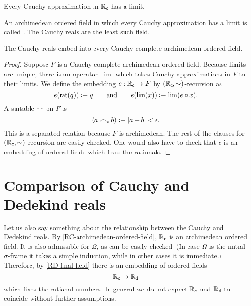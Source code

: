 \begin{thm}
  Every Cauchy approximation in $\mathbb{R}_\mathsf{c}$ has a limit.
\end{thm}

An archimedean ordered field in which every Cauchy approximation has a limit is called
.
%
%
%
The Cauchy reals are the least such field.

\begin{thm} \label{RC-initial-Cauchy-complete}
  The Cauchy reals embed into every Cauchy complete archimedean ordered field.
\end{thm}

\begin{proof}
  Suppose $F$ is a Cauchy complete archimedean ordered field. Because limits are unique,
  there is an operator $\lim$ which takes Cauchy approximations in $F$ to their limits. We
  define the embedding $e : \mathbb{R}_\mathsf{c} \to F$ by $(\mathbb{R}_\mathsf{c}, {\mathord\sim})$-recursion as
  \begin{equation*}
    e(\mathsf{rat}(q)) \vcentcolon\equiv q
    \qquad\text{and}\qquad
    e(\mathsf{lim}(x)) \vcentcolon\equiv \lim (e \circ x).
  \end{equation*}
  A suitable $\frown$ on $F$ is
  \begin{equation*}
    (a \frown_\epsilon b) \vcentcolon\equiv |a - b| < \epsilon.
  \end{equation*}
  This is a separated relation because $F$ is archimedean. The rest of the clauses for
  $(\mathbb{R}_\mathsf{c}, {\mathord\sim})$-recursion are easily checked. One would also have to check that $e$ is
  an embedding of ordered fields which fixes the rationals.
\end{proof}


\section{Comparison of Cauchy and Dedekind reals}
\label{sec:comp-cauchy-dedek}

Let us also say something about the relationship between the Cauchy and Dedekind reals. By
\autoref{RC-archimedean-ordered-field}, $\mathbb{R}_\mathsf{c}$ is an archimedean ordered field. It is also
admissible for $\Omega$, as can be easily checked. (In case $\Omega$ is the initial
$\sigma$-frame
%
%
it takes a simple induction, while in other cases it is immediate.)
Therefore, by \autoref{RD-final-field} there is an embedding of ordered fields
%
\begin{equation*}
  \mathbb{R}_\mathsf{c} \to \mathbb{R}_\mathsf{d}
\end{equation*}
%
which fixes the rational numbers. In general we do not expect $\mathbb{R}_\mathsf{c}$ and $\mathbb{R}_\mathsf{d}$ to coincide
without further assumptions. 


